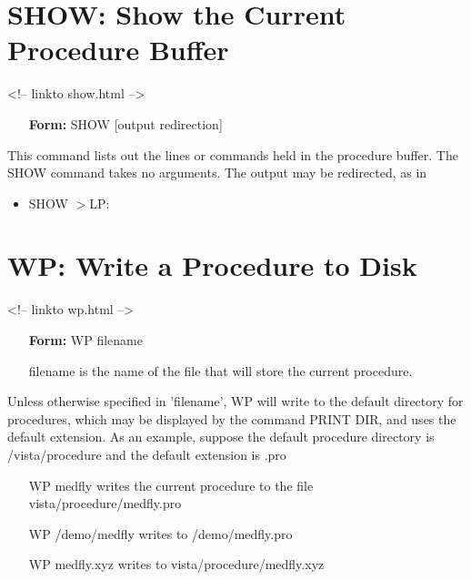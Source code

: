 \section{SHOW: Show the Current Procedure Buffer}
\begin{rawhtml}
<!-- linkto show.html -->
\end{rawhtml}

\begin{itemize}
  \item[\textbf{Form: } SHOW {[output redirection]}\hfill]{}
\end{itemize}

This command lists out the lines or commands held in the procedure buffer.
The SHOW command takes no arguments.  The output may be redirected, as in
\begin{itemize}
  \item{SHOW $>$LP:}
\end{itemize}

\section{WP: Write a Procedure to Disk}
\begin{rawhtml}
<!-- linkto wp.html -->
\end{rawhtml}

\begin{itemize}
  \item[\textbf{Form: } WP filename\hfill]{}
  \item[filename]{is the name of the file that will store the current procedure.}
\end{itemize}

Unless otherwise specified in 'filename', WP will write to the default
directory for procedures, which may be displayed by the command PRINT DIR,
and uses the default extension.  As an example, suppose the default
procedure directory is /vista/procedure and the default extension is .pro

\begin{itemize}
  \item[WP medfly\hfill]{writes the current procedure to the file
       vista/procedure/medfly.pro}
  \item[WP /demo/medfly\hfill]{writes to /demo/medfly.pro}
  \item[WP medfly.xyz\hfill]{writes to vista/procedure/medfly.xyz}
\end{itemize}

